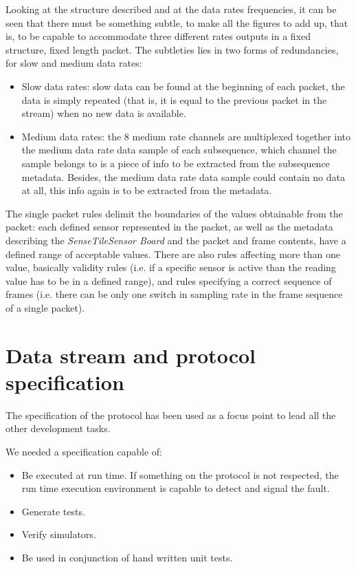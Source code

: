 \documentclass{article} \usepackage{times}
\newcommand{\ST}{\emph{SenseTile}\xspace}
\newcommand{\SB}{\emph{Sensor Board}\xspace}
\newcommand{\STSB}{\ST \SB\xspace}
\begin{document}
Looking at the structure described and at the data rates frequencies, it
can be seen that there must be something subtle, to make all the figures to 
add up, that is, to be capable to accommodate three different rates outputs
in a fixed structure, fixed length packet.
The subtleties lies in two forms of redundancies, for slow and medium data 
rates:

\begin{itemize}
  \item Slow data rates: slow data can be found at the beginning of each 
  packet, the data is simply repeated (that is, it is equal to the previous 
  packet in the stream) when no new data is available.
  \item Medium data rates: the 8 medium rate channels are multiplexed together 
  into the medium data rate data sample of each subsequence, which channel the 
  sample belongs to is a piece of info to be extracted from the subsequence 
  metadata. Besides, the medium data rate data sample could contain no data at 
  all, this info again is to be extracted from the metadata.
\end{itemize}

The single packet rules delimit the boundaries of the values obtainable from 
the packet: each defined sensor represented in the packet, as well as the 
metadata describing the \STSB and the packet and frame contents,  have a defined 
range of acceptable values.
There are also rules affecting more than one value, basically validity rules (i.e. if 
a specific sensor is active than the reading value has to be in a defined range), 
and rules specifying a correct sequence of frames (i.e. there can be only one switch 
in sampling rate in the frame sequence of a single packet).



\section{Data stream and protocol specification}
\label{sec:data_stream_and_protocol_specification}

The specification of the protocol has been used as a focus point to lead all the 
other development tasks.

We needed a specification capable of:

\begin{itemize}
 \item Be executed at run time. If something on the protocol is not respected, 
the run time execution environment is capable to detect and signal the fault.
 \item Generate tests. 
 \item Verify simulators.
 \item Be used in conjunction of hand written unit tests.
\end{itemize}
\end{document}
